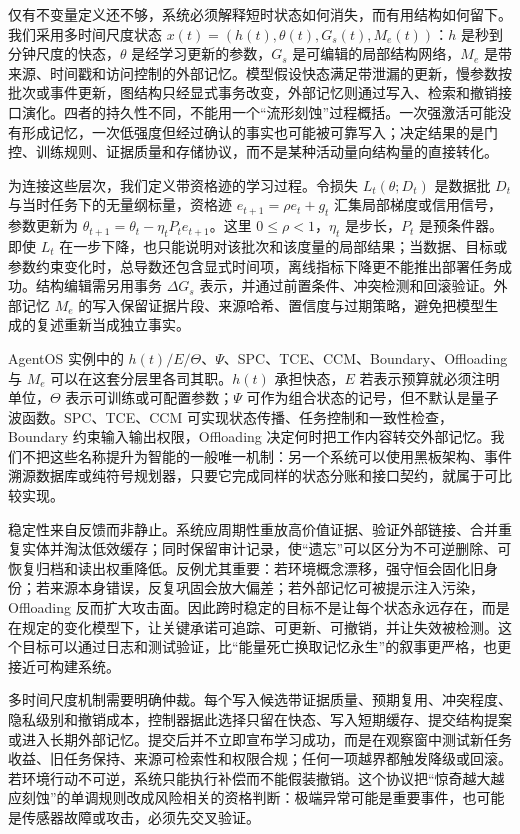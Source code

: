 仅有不变量定义还不够，系统必须解释短时状态如何消失，而有用结构如何留下。我们采用多时间尺度状态 $x(t)=(h(t),\theta(t),G_s(t),M_e(t))$：$h$ 是秒到分钟尺度的快态，$\theta$ 是经学习更新的参数，$G_s$ 是可编辑的局部结构网络，$M_e$ 是带来源、时间戳和访问控制的外部记忆。模型假设快态满足带泄漏的更新，慢参数按批次或事件更新，图结构只经显式事务改变，外部记忆则通过写入、检索和撤销接口演化。四者的持久性不同，不能用一个“流形刻蚀”过程概括。一次强激活可能没有形成记忆，一次低强度但经过确认的事实也可能被可靠写入；决定结果的是门控、训练规则、证据质量和存储协议，而不是某种活动量向结构量的直接转化。

为连接这些层次，我们定义带资格迹的学习过程。令损失 $L_t(\theta;D_t)$ 是数据批 $D_t$ 与当时任务下的无量纲标量，资格迹 $e_{t+1}=\rho e_t+g_t$ 汇集局部梯度或信用信号，参数更新为 $\theta_{t+1}=\theta_t-\eta_t P_t e_{t+1}$。这里 $0\leq\rho<1$，$\eta_t$ 是步长，$P_t$ 是预条件器。即使 $L_t$ 在一步下降，也只能说明对该批次和该度量的局部结果；当数据、目标或参数约束变化时，总导数还包含显式时间项，离线指标下降更不能推出部署任务成功。结构编辑需另用事务 $\Delta G_s$ 表示，并通过前置条件、冲突检测和回滚验证。外部记忆 $M_e$ 的写入保留证据片段、来源哈希、置信度与过期策略，避免把模型生成的复述重新当成独立事实。

AgentOS 实例中的 $h(t)/E/\Theta$、$\Psi$、SPC、TCE、CCM、Boundary、Offloading 与 $M_e$ 可以在这套分层里各司其职。$h(t)$ 承担快态，$E$ 若表示预算就必须注明单位，$\Theta$ 表示可训练或可配置参数；$\Psi$ 可作为组合状态的记号，但不默认是量子波函数。SPC、TCE、CCM 可实现状态传播、任务控制和一致性检查，Boundary 约束输入输出权限，Offloading 决定何时把工作内容转交外部记忆。我们不把这些名称提升为智能的一般唯一机制：另一个系统可以使用黑板架构、事件溯源数据库或纯符号规划器，只要它完成同样的状态分账和接口契约，就属于可比较实现。

稳定性来自反馈而非静止。系统应周期性重放高价值证据、验证外部链接、合并重复实体并淘汰低效缓存；同时保留审计记录，使“遗忘”可以区分为不可逆删除、可恢复归档和读出权重降低。反例尤其重要：若环境概念漂移，强守恒会固化旧身份；若来源本身错误，反复巩固会放大偏差；若外部记忆可被提示注入污染，Offloading 反而扩大攻击面。因此跨时稳定的目标不是让每个状态永远存在，而是在规定的变化模型下，让关键承诺可追踪、可更新、可撤销，并让失效被检测。这个目标可以通过日志和测试验证，比“能量死亡换取记忆永生”的叙事更严格，也更接近可构建系统。

多时间尺度机制需要明确仲裁。每个写入候选带证据质量、预期复用、冲突程度、隐私级别和撤销成本，控制器据此选择只留在快态、写入短期缓存、提交结构提案或进入长期外部记忆。提交后并不立即宣布学习成功，而是在观察窗中测试新任务收益、旧任务保持、来源可检索性和权限合规；任何一项越界都触发降级或回滚。若环境行动不可逆，系统只能执行补偿而不能假装撤销。这个协议把“惊奇越大越应刻蚀”的单调规则改成风险相关的资格判断：极端异常可能是重要事件，也可能是传感器故障或攻击，必须先交叉验证。

